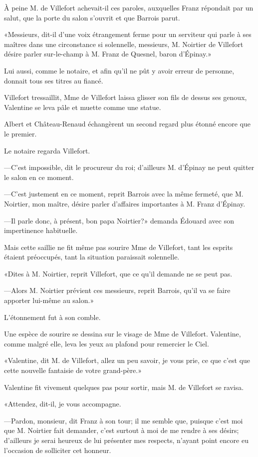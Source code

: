 À peine M. de Villefort achevait-il ces paroles, auxquelles Franz répondait par un salut, que la porte du salon s'ouvrit et que Barrois parut. 

«Messieurs, dit-il d'une voix étrangement ferme pour un serviteur qui parle à ses maîtres dans une circonstance si solennelle, messieurs, M. Noirtier de Villefort désire parler sur-le-champ à M. Franz de Quesnel, baron d'Épinay.»  

Lui aussi, comme le notaire, et afin qu'il ne pût y avoir erreur de personne, donnait tous ses titres au fiancé. 

Villefort tressaillit, Mme de Villefort laissa glisser son fils de dessus ses genoux, Valentine se leva pâle et muette comme une statue. 

Albert et Château-Renaud échangèrent un second regard plus étonné encore que le premier. 

Le notaire regarda Villefort. 

—C'est impossible, dit le procureur du roi; d'ailleurs M. d'Épinay ne peut quitter le salon en ce moment. 

—C'est justement en ce moment, reprit Barrois avec la même fermeté, que M. Noirtier, mon maître, désire parler d'affaires importantes à M. Franz d'Épinay. 

—Il parle donc, à présent, bon papa Noirtier?» demanda Édouard avec son impertinence habituelle. 

Mais cette saillie ne fit même pas sourire Mme de Villefort, tant les esprits étaient préoccupés, tant la situation paraissait solennelle. 

«Dites à M. Noirtier, reprit Villefort, que ce qu'il demande ne se peut pas. 

—Alors M. Noirtier prévient ces messieurs, reprit Barrois, qu'il va se faire apporter lui-même au salon.»  

L'étonnement fut à son comble. 

Une espèce de sourire se dessina sur le visage de Mme de Villefort. Valentine, comme malgré elle, leva les yeux au plafond pour remercier le Ciel. 

«Valentine, dit M. de Villefort, allez un peu savoir, je vous prie, ce que c'est que cette nouvelle fantaisie de votre grand-père.» 

Valentine fit vivement quelques pas pour sortir, mais M. de Villefort se ravisa. 

«Attendez, dit-il, je vous accompagne. 

—Pardon, monsieur, dit Franz à son tour; il me semble que, puisque c'est moi que M. Noirtier fait demander, c'est surtout à moi de me rendre à ses désirs; d'ailleurs je serai heureux de lui présenter mes respects, n'ayant point encore eu l'occasion de solliciter cet honneur. 

